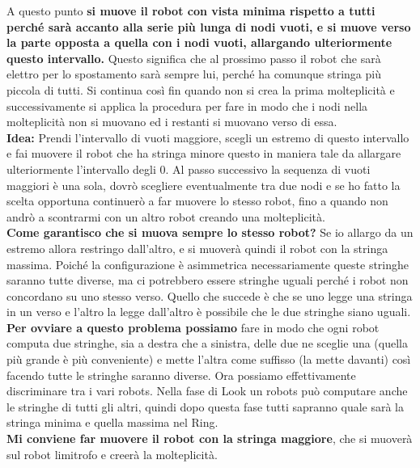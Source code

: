 A questo punto \textbf{si muove il robot con vista minima rispetto a tutti
    perché sarà accanto alla serie più lunga di nodi vuoti, e si muove verso la
    parte opposta a quella con i nodi vuoti, allargando ulteriormente questo
    intervallo.} Questo significa che al prossimo passo il robot che sarà elettro
per lo spostamento sarà sempre lui, perché ha comunque stringa più piccola di
tutti. Si continua così fin quando non si crea la prima molteplicità e
successivamente si applica la procedura per fare in modo che i nodi nella
molteplicità non si muovano ed i restanti si muovano verso di essa.\\

\textbf{Idea:} Prendi l'intervallo di vuoti maggiore, scegli un estremo di
questo intervallo e fai muovere il robot che ha stringa minore questo in maniera
tale da allargare ulteriormente l'intervallo degli 0. Al passo successivo la
sequenza di vuoti maggiori è una sola, dovrò scegliere eventualmente tra due
nodi e se ho fatto la scelta opportuna continuerò a far muovere lo stesso robot,
fino a quando non andrò a scontrarmi con un altro robot creando una
molteplicità.\\
\textbf{Come garantisco che si muova sempre lo stesso robot?} Se io allargo da
un estremo allora restringo dall'altro, e si muoverà quindi il robot con la
stringa massima. Poiché la configurazione è asimmetrica necessariamente queste
stringhe saranno tutte diverse, ma ci potrebbero essere stringhe uguali perché i
robot non concordano su uno stesso verso. Quello che succede è che se uno legge
una stringa in un verso e l'altro la legge dall'altro è possibile che le due
stringhe siano uguali.\\
\textbf{Per ovviare a questo problema possiamo} fare in modo che ogni robot
computa due stringhe, sia a destra che a sinistra, delle due ne sceglie una
(quella più grande è più conveniente) e mette l'altra come suffisso (la mette
davanti) così facendo tutte le stringhe saranno diverse. Ora possiamo
effettivamente discriminare tra i vari robots. Nella fase di Look un robots può
computare anche le stringhe di tutti gli altri, quindi dopo questa fase tutti
sapranno quale sarà la stringa minima e quella massima nel Ring.\\
\textbf{Mi conviene far muovere il robot con la stringa maggiore}, che si
muoverà sul robot limitrofo e creerà la molteplicità.

